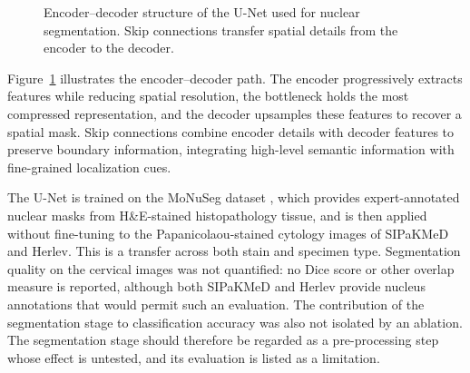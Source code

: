 \documentclass[runningheads]{llncs}
\begin{document}
\begin{figure}[t]
\centering
{}

\caption{Encoder--decoder structure of the U-Net used for nuclear segmentation. Skip connections transfer spatial details from the encoder to the decoder.}
\label{fig:unet}
\end{figure}

Figure~\ref{fig:unet} illustrates the encoder--decoder path. The encoder progressively extracts features while reducing spatial resolution, the bottleneck holds the most compressed representation, and the decoder upsamples these features to recover a spatial mask. Skip connections combine encoder details with decoder features to preserve boundary information, integrating high-level semantic information with fine-grained localization cues.

The U-Net is trained on the MoNuSeg dataset \cite{kumar2017monuseg}, which provides expert-annotated nuclear masks from H\&E-stained histopathology tissue, and is then applied without fine-tuning to the Papanicolaou-stained cytology images of SIPaKMeD and Herlev. This is a transfer across both stain and specimen type. Segmentation quality on the cervical images was not quantified: no Dice score or other overlap measure is reported, although both SIPaKMeD and Herlev provide nucleus annotations that would permit such an evaluation. The contribution of the segmentation stage to classification accuracy was also not isolated by an ablation. The segmentation stage should therefore be regarded as a pre-processing step whose effect is untested, and its evaluation is listed as a limitation.
\end{document}
